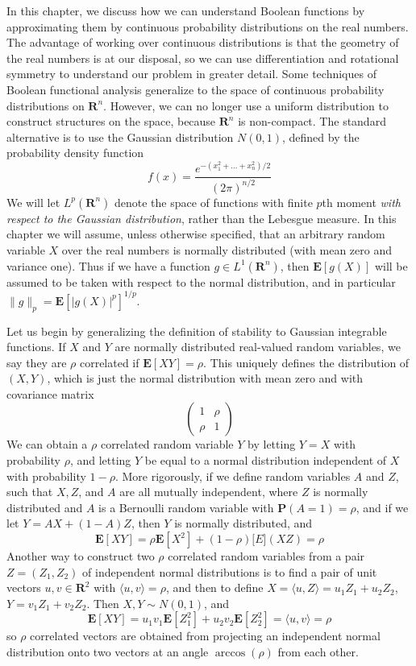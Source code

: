 In this chapter, we discuss how we can understand Boolean functions by approximating them by continuous probability distributions on the real numbers. The advantage of working over continuous distributions is that the geometry of the real numbers is at our disposal, so we can use differentiation and rotational symmetry to understand our problem in greater detail. Some techniques of Boolean functional analysis generalize to the space of continuous probability distributions on $\mathbf{R}^n$. However, we can no longer use a uniform distribution to construct structures on the space, because $\mathbf{R}^n$ is non-compact. The standard alternative is to use the Gaussian distribution $N(0,1)$, defined by the probability density function
%
\[ f(x) = \frac{e^{-(x_1^2 + \dots + x_n^2)/2}}{(2 \pi)^{n/2}} \]
%
We will let $L^p(\mathbf{R}^n)$ denote the space of functions with finite $p$th moment {\it with respect to the Gaussian distribution}, rather than the Lebesgue measure. In this chapter we will assume, unless otherwise specified, that an arbitrary random variable $X$ over the real numbers is normally distributed (with mean zero and variance one). Thus if we have a function $g \in L^1(\mathbf{R}^n)$, then $\mathbf{E}[g(X)]$ will be assumed to be taken with respect to the normal distribution, and in particular $\| g \|_p = \mathbf{E}[|g(X)|^p]^{1/p}$.

Let us begin by generalizing the definition of stability to Gaussian integrable functions. If $X$ and $Y$ are normally distributed real-valued random variables, we say they are $\rho$ correlated if $\mathbf{E}[XY] = \rho$. This uniquely defines the distribution of $(X,Y)$, which is just the normal distribution with mean zero and with covariance matrix
%
\[ \begin{pmatrix} 1 & \rho \\ \rho & 1 \end{pmatrix} \]
%
We can obtain a $\rho$ correlated random variable $Y$ by letting $Y = X$ with probability $\rho$, and letting $Y$ be equal to a normal distribution independent of $X$ with probability $1 - \rho$. More rigorously, if we define random variables $A$ and $Z$, such that $X,Z$, and $A$ are all mutually independent, where $Z$ is normally distributed and $A$ is a Bernoulli random variable with $\mathbf{P}(A = 1) = \rho$, and if we let $Y = AX + (1-A)Z$, then $Y$ is normally distributed, and
%
\[ \mathbf{E}[XY] = \rho \mathbf{E}[X^2] + (1 - \rho) \mathbf[E](XZ) = \rho \]
%
Another way to construct two $\rho$ correlated random variables from a pair $Z = (Z_1,Z_2)$ of independent normal distributions  is to find a pair of unit vectors $u,v \in \mathbf{R}^2$ with $\langle u,v \rangle = \rho$, and then to define $X = \langle u, Z \rangle = u_1 Z_1 + u_2 Z_2$, $Y = v_1 Z_1 + v_2Z_2$. Then $X,Y \sim N(0,1)$, and
%
\[ \mathbf{E}[XY] = u_1v_1 \mathbf{E}[Z_1^2] + u_2v_2 \mathbf{E}[Z_2^2] = \langle u,v \rangle = \rho \]
%
so $\rho$ correlated vectors are obtained from projecting an independent normal distribution onto two vectors at an angle $\arccos(\rho)$ from each other.

